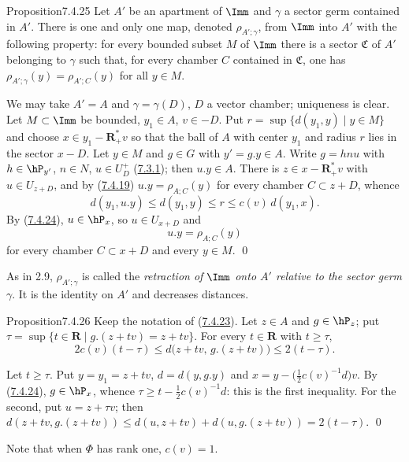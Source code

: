 \documentclass[12pt,a4paper,oneside,english]{smfart}
\makeatletter
\newcommand{\btanchor}[1]{\leavevmode\Hy@raisedlink{\hypertarget{bt:#1}{}}}
\newcommand{\btref}[1]{\hyperlink{bt:#1}{#1}}
\theoremstyle{definition}
\theoremstyle{bt}
\makeatother
\begin{document}
\begin{stmt}{Proposition}{7.4.25}\btanchor{7.4.25}
Let $A'$ be an apartment of $\Imm$ and $\gamma$ a sector germ contained in $A'$.
There is one and only one map, denoted $\rho_{A';\gamma}$, from $\Imm$ into $A'$
with the following property: for every bounded subset $M$ of $\Imm$ there is a
sector $\mathfrak{C}$ of $A'$ belonging to $\gamma$ such that, for every chamber $C$
contained in $\mathfrak{C}$, one has $\rho_{A';\gamma}(y)=\rho_{A';C}(y)$ for all
$y\in M$.
\end{stmt}

\pf We may take $A'=A$ and $\gamma=\gamma(D)$, $D$ a vector chamber; uniqueness is
clear. Let $M\subset\Imm$ be bounded, $y_1\in A$, $v\in-D$. Put
$r=\sup\{d(y_1,y)\mid y\in M\}$ and choose $x\in y_1-\mathbf{R}^{*}_{+}v$ so that
the ball of $A$ with center $y_1$ and radius $r$ lies in the sector $x-D$. Let
$y\in M$ and $g\in G$ with $y'=g.y\in A$. Write $g=hnu$ with $h\in\hP_{y'}$,
$n\in N$, $u\in U_D^{+}$ (\btref{7.3.1}); then $u.y\in A$. There is
$z\in x-\mathbf{R}^{*}_{+}v$ with $u\in U_{z+D}$, and by (\btref{7.4.19})
$u.y=\rho_{A;C}(y)$ for every chamber $C\subset z+D$, whence
\[
  d(y_1,u.y)\leqslant d(y_1,y)\leqslant r\leqslant c(v)\,d(y_1,x).
\]
By (\btref{7.4.24}), $u\in\hP_x$, so $u\in U_{x+D}$ and
\begin{equation}
  u.y=\rho_{A;C}(y) \tag{1}
\end{equation}
for every chamber $C\subset x+D$ and every $y\in M$. \qed

\smallskip
As in 2.9, $\rho_{A';\gamma}$ is called the \emph{retraction of $\Imm$ onto $A'$
relative to the sector germ $\gamma$}. It is the identity on $A'$ and decreases
distances.

\begin{stmt}{Proposition}{7.4.26}\btanchor{7.4.26}
Keep the notation of \textup{(\btref{7.4.23})}. Let $z\in A$ and $g\in\hP_z$; put
$\tau=\sup\{t\in\mathbf{R}\mid g.(z+tv)=z+tv\}$. For every $t\in\mathbf{R}$ with
$t\geqslant\tau$,
\[
  2c(v)(t-\tau)\leqslant d\bigl(z+tv,\,g.(z+tv)\bigr)\leqslant2(t-\tau).
\]
\end{stmt}

\pf Let $t\geqslant\tau$. Put $y=y_1=z+tv$, $d=d(y,g.y)$ and
$x=y-\bigl(\tfrac12c(v)^{-1}d\bigr)v$. By (\btref{7.4.24}), $g\in\hP_x$, whence
$\tau\geqslant t-\tfrac12c(v)^{-1}d$: this is the first inequality. For the second,
put $u=z+\tau v$; then
$d(z+tv,g.(z+tv))\leqslant d(u,z+tv)+d(u,g.(z+tv))=2(t-\tau)$. \qed

\smallskip
Note that when $\Phi$ has rank one, $c(v)=1$.
\end{document}
